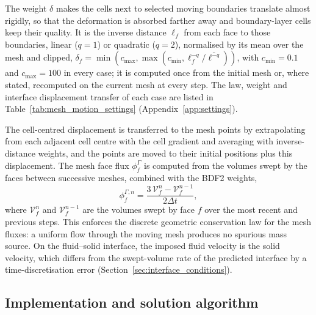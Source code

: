 The weight $\delta$ makes the cells next to selected moving boundaries translate almost rigidly, so that the deformation is absorbed farther away and boundary-layer cells keep their quality.
It is the inverse distance $\ell_f$ from each face to those boundaries, linear ($q = 1$) or quadratic ($q = 2$), normalised by its mean over the mesh and clipped, $\delta_f = \min\left(c_{\max}, \max\left(c_{\min}, \ell_f^{-q}/\overline{\ell^{-q}}\right)\right)$, with $c_{\min} = 0.1$ and $c_{\max} = 100$ in every case; it is computed once from the initial mesh or, where stated, recomputed on the current mesh at every step.
The law, weight and interface displacement transfer of each case are listed in Table~\ref{tab:mesh_motion_settings} (Appendix~\ref{app:settings}).

The cell-centred displacement is transferred to the mesh points by extrapolating from each adjacent cell centre with the cell gradient and averaging with inverse-distance weights, and the points are moved to their initial positions plus this displacement.
The mesh face flux $\phi^{\Gamma}_f$ is computed from the volumes swept by the faces between successive meshes, combined with the BDF2 weights,
\begin{equation}
\phi^{\Gamma,n}_f
=
\frac{
3 \, \mathcal{V}^{n}_{f}
-
\mathcal{V}^{n-1}_{f}
}
{2\Delta t},
    \label{eqn:gcl_swept_volume}
\end{equation}
where $\mathcal{V}^{n}_{f}$ and $\mathcal{V}^{n-1}_{f}$ are the volumes swept by face $f$ over the most recent and previous steps.
This enforces the discrete geometric conservation law for the mesh fluxes: a uniform flow through the moving mesh produces no spurious mass source.
On the fluid--solid interface, the imposed fluid velocity is the solid velocity, which differs from the swept-volume rate of the predicted interface by a time-discretisation error (Section~\ref{sec:interface_conditions}).

\subsection{Implementation and solution algorithm}
\label{sec:implementation_details}


